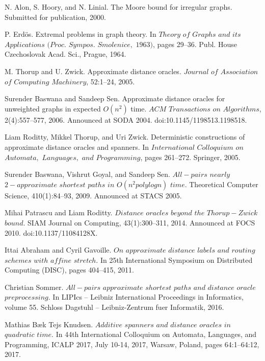 \documentclass[shortabstract, lic, english]{iithesis}
\theoremstyle{definition} \newtheorem{definition}{Definition}[chapter]
\theoremstyle{remark} \newtheorem{remark}[definition]{Observation}
\theoremstyle{plain} \newtheorem{theorem}[definition]{Theorem}
\theoremstyle{plain} \newtheorem{lemma}[definition]{Lemma}
\theoremstyle{plain} \newtheorem{conjecture}[definition]{Conjecture}
\begin{document}
\begin{thebibliography}{1}
N. Alon, S. Hoory, and N. Linial. The Moore bound for irregular
graphs. Submitted for publication, 2000.

P. Erd{\"o}s. Extremal problems in graph theory. In $Theory$ $of$ $Graphs$
$and$ $its$ $Applications$ $(Proc.$ $Sympos.$ $Smolenice,$ $1963)$, pages 29–36.
Publ. House Czechoslovak Acad. Sci., Prague, 1964.

M. Thorup and U. Zwick. Approximate distance oracles. $Journal$ $of$ $Association$ $of$ $Computing$
$Machinery$, 52:1–24, 2005.

Surender Baswana and Sandeep Sen. Approximate distance oracles for unweighted graphs
in expected $O(n^2)$ time. $ACM$ $Transactions$ $on$ $Algorithms$, 2(4):557–577, 2006. Announced
at SODA 2004. doi:10.1145/1198513.1198518.

Liam Roditty, Mikkel Thorup, and Uri Zwick. Deterministic constructions of approximate
distance oracles and spanners. In $International$ $Colloquium$ $on$ $Automata,$ $Languages,$ $and$
$Programming$, pages 261–272. Springer, 2005.

Surender Baswana, Vishrut Goyal, and Sandeep Sen. $All-pairs$ $nearly$ $2-approximate$ $shortest$ 
$paths$ $in$ $O(n^2poly log n)$ $time.$ Theoretical Computer Science, 410(1):84–93, 2009. Announced at STACS 2005.

Mihai Patrascu and Liam Roditty. $Distance$ $oracles$ $beyond$ $the$ $Thorup-Zwick$ $bound.$
SIAM Journal on Computing, 43(1):300–311, 2014. Announced at FOCS 2010.
doi:10.1137/11084128X.

Ittai Abraham and Cyril Gavoille. $On$ $approximate$ $distance$ $labels$ $and$ $routing$ $schemes$
$with$ $affine$ $stretch.$ In 25th International Symposium on Distributed Computing (DISC),
pages 404–415, 2011.

Christian Sommer. $All-pairs$ $approximate$ $shortest$ $paths$ $and$ $distance$ $oracle$ $preprocessing.$
In LIPIcs – Leibniz International Proceedings in Informatics, volume 55. Schloss Dagstuhl
– Leibniz-Zentrum fuer Informatik, 2016.

Mathias Bæk Tejs Knudsen. $Additive$ $spanners$ $and$ $distance$ $oracles$ $in$ $quadratic$ $time.$
In 44th International Colloquium on Automata, Languages, and Programming, ICALP
2017, July 10-14, 2017, Warsaw, Poland, pages 64:1–64:12, 2017.


\end{thebibliography}
\end{document}
